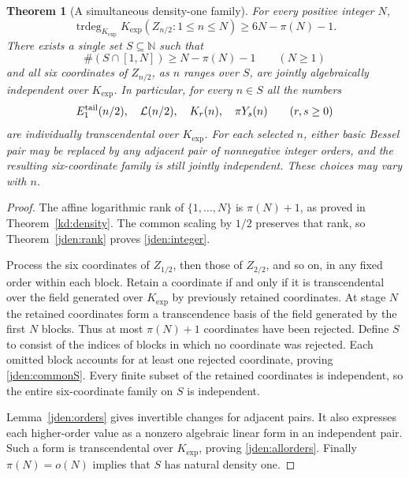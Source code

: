 \documentclass[11pt]{article}
\newtheorem{theorem}{Theorem}[section]
\theoremstyle{definition}
\theoremstyle{remark}
\newcommand{\trdeg}{\operatorname{trdeg}}
\newcommand{\Kexp}{K_{\mathrm{exp}}}
\begin{document}
\begin{theorem}[A simultaneous density-one family]\label{jden:density}
For every positive integer $N$,
\begin{equation}\label{jden:integer}
 \trdeg_{\Kexp}\Kexp(Z_{n/2}:1\le n\le N)
       \ge6N-\pi(N)-1.
\end{equation}
There exists a single set $S\subseteq\mathbb N$ such that
\begin{equation}\label{jden:commonS}
 \#(S\cap[1,N])\ge N-\pi(N)-1\qquad(N\ge1)
\end{equation}
and all six coordinates of $Z_{n/2}$, as $n$ ranges over $S$, are
jointly algebraically independent over $\Kexp$. In particular, for
every $n\in S$ all the numbers
\begin{equation}\label{jden:allorders}
 E_1^{\rm tail}(n/2),\quad\mathcal L(n/2),\quad
 K_r(n),\quad\pi Y_s(n)\qquad(r,s\ge0)
\end{equation}
are individually transcendental over $\Kexp$.
For each selected $n$, either basic Bessel pair may be replaced by
any adjacent pair of nonnegative integer orders, and the resulting
six-coordinate family is still jointly independent. These choices
may vary with $n$.
\end{theorem}

\begin{proof}
The affine logarithmic rank of $\{1,\ldots,N\}$ is $\pi(N)+1$,
as proved in Theorem~\ref{kd:density}. The common scaling by $1/2$
preserves that rank, so Theorem~\ref{jden:rank} proves
\eqref{jden:integer}.

Process the six coordinates of $Z_{1/2}$, then those of $Z_{2/2}$,
and so on, in any fixed order within each block. Retain a coordinate
if and only if it is transcendental over the field generated over
$\Kexp$ by previously retained coordinates. At stage $N$ the
retained coordinates form a transcendence basis of the field generated
by the first $N$ blocks. Thus at most $\pi(N)+1$ coordinates have
been rejected. Define $S$ to consist of the indices of blocks in
which no coordinate was rejected. Each omitted block accounts for
at least one rejected coordinate, proving \eqref{jden:commonS}.
Every finite subset of the retained coordinates is independent, so
the entire six-coordinate family on $S$ is independent.

Lemma~\ref{jden:orders} gives invertible changes for adjacent pairs.
It also expresses each higher-order value as a nonzero algebraic
linear form in an independent pair. Such a form is transcendental
over $\Kexp$, proving \eqref{jden:allorders}. Finally
$\pi(N)=o(N)$ implies that $S$ has natural density one.
\end{proof}
\end{document}
